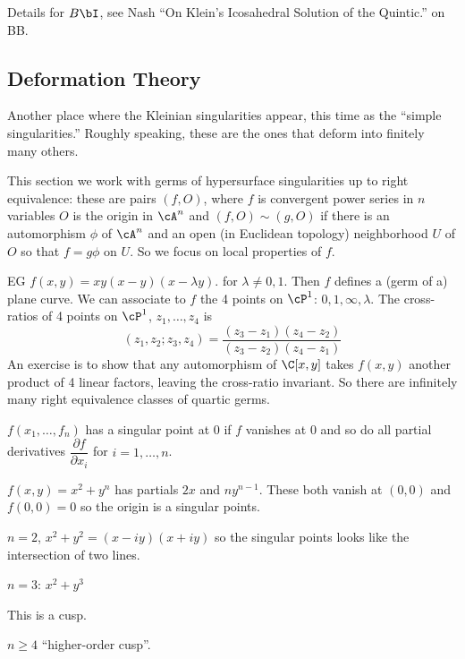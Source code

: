 Details for $B\bI$, see Nash ``On Klein's Icosahedral Solution of the Quintic.'' on BB.



\subsection{Deformation Theory}

Another place where the Kleinian singularities appear, this time as the ``simple singularities.'' Roughly speaking, these are the ones that deform into finitely many others. 

This section we work with germs of hypersurface singularities up to right equivalence: these are pairs $(f,O)$, where $f$ is convergent power series in $n$ variables $O$ is the origin in $\cA^n$ and $(f,O) \sim (g,O)$ if there is an automorphism $\phi$ of $\cA^n$ and an open (in Euclidean topology) neighborhood $U$ of $O$ so that $f=g \phi$ on $U$. So we focus on local properties of $f$. 


EG $f(x,y)= xy(x-y)(x-\lambda y)$. for $\lambda \neq 0,1$. Then $f$ defines a (germ of a) plane curve.   We can associate to $f$ the 4 points on $\cP^1$: $0,1,\infty,\lambda$. The cross-ratios of 4 points on $\cP^1$, $z_1,\ldots,z_4$ is 
	\[
	(z_1,z_2; z_3,z_4)= \dfrac{(z_3-z_1)(z_4-z_2)}{(z_3-z_2)(z_4-z_1)}
	\]
An exercise is to show that any automorphism of $\C[x,y]$ takes $f(x,y)$ another product of 4 linear factors, leaving the cross-ratio invariant. So there are infinitely many right equivalence classes of quartic germs. 


\begin{dfn}[Singularity]
$f(x_1,\ldots,f_n)$ has a singular point at $0$ if $f$ vanishes at 0 and so do all partial derivatives $\dfrac{\partial f}{\partial x_i}$ for $i=1,\ldots,n$. 
\end{dfn}


\begin{ex}
 $f(x,y)= x^2+y^n$ has partials $2x$ and $ny^{n-1}$. These both vanish at $(0,0)$ and $f(0,0)=0$ so the origin is a singular points.

$n=2$, $x^2+y^2= (x-iy)(x+iy)$ so the singular points looks like the intersection of two lines. 


$n=3$: $x^2+y^3$


This is a cusp.

$n \geq 4$ ``higher-order cusp''. 

\end{ex}


